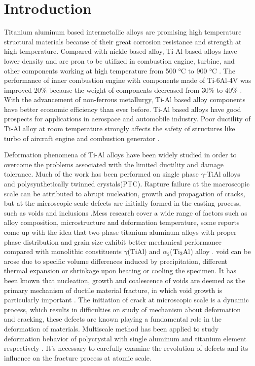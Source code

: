 \documentclass[materials,article,submit,moreauthors,pdftex,10pt,a4paper]{Definitions/mdpi}
\begin{document}
\section{Introduction}
Titanium  aluminum based intermetallic alloys are promising high temperature structural materials because of their great corrosion resistance and strength at high temperature. Compared with nickle based alloy,  Ti-Al based alloys have lower density and are pron to be utilized in combustion engine, turbine, and other components working at high temperature from 500 \si{\degreeCelsius} to 900 \si{\degreeCelsius} \cite{Clemens2016}. The performance of inner combustion engine with components made of Ti-6Al-4V was improved  20\% because the weight of components decreased from 30\% to 40\% \cite{Bewlay2016}. With the advancement of non-ferrous metallurgy, Ti-Al based alloy components have better economic efficiency than ever before. Ti-Al based alloys have good prospects for applications in aerospace and automobile industry. 
Poor ductility of Ti-Al alloy  at room temperature strongly affects the safety of structures like turbo of aircraft engine and combustion generator \cite{Munz2017}. 

Deformation phenomena of Ti-Al alloys have been widely studied in order to overcome the problems associated with the limited ductility and damage tolerance.  Much of the work has been performed on single phase $\gamma$-TiAl alloys and polysynthetically twinned crystals(PTC)\cite{Appel2016}. Rapture failure at the macroscopic scale can be attributed to abrupt nucleation, growth and propagation of cracks, but at the microscopic scale defects are initially formed in the casting process, such as voids and inclusions \cite{Tang2014}.Mess research  cover a wide range of factors such as alloy composition, microstructure and deformation temperature, some reports come up with the idea that two phase titanium aluminum alloys with proper phase distribution and grain size exhibit better mechanical performance compared with monolithic constituents $\gamma$(TiAl) and $\alpha_2$($\rm Ti_3Al$) alloy \cite{Kim1995}. 
void can be arose due to specific volume differences induced by precipitation, different thermal expansion or shrinkage upon heating or cooling the specimen. It has been known that nucleation, growth and coalescence of voids are deemed as the primary mechanism of ductile material fracture, in which void growth is particularly important \cite{Hempel2017a}. The initiation of crack at microscopic scale is a dynamic process, which results in difficulties on study of  mechanism about deformation and cracking, these defects are known playing a fundamental role in the deformation of materials. Multiscale method has been applied to study deformation behavior of polycrystal with single aluminum \cite{Groh2009} and titanium element respectively \cite{Liu2018}. It's necessary to carefully examine the revolution of defects and its influence on the fracture process at atomic scale. 
\end{document}
